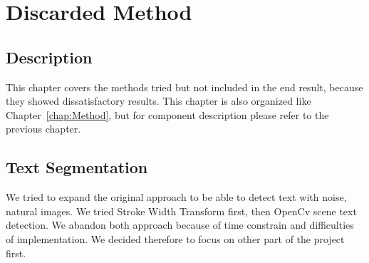 \documentclass[Report.tex]{subfiles}
\begin{document}
\chapter{Discarded Method}
\label{chap:Discarded Method}
\section{Description}
This chapter covers the methods tried but not included in the end result, because they showed dissatisfactory results. This chapter is also organized like Chapter~\ref{chap:Method}, but for component description please refer to the previous chapter.

\section{Text Segmentation}
We tried to expand the original approach to be able to detect text with noise, natural images. We tried Stroke Width Transform first, then OpenCv scene text detection. We abandon both approach because of time constrain and difficulties of implementation. We decided therefore to focus on other part of the project first. 
\end{document}
